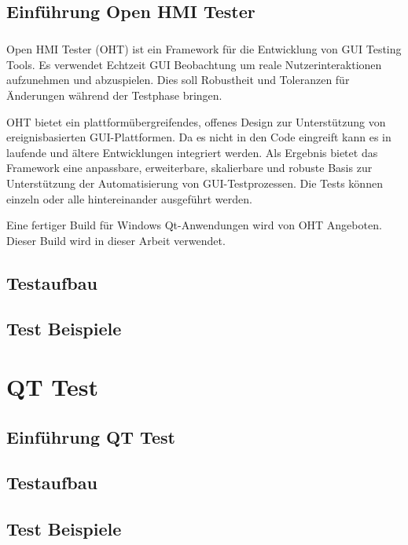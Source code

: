 		\section{Einführung Open HMI Tester}
		\paragraph{} Open HMI Tester (OHT) ist ein Framework für die Entwicklung von GUI Testing Tools. Es verwendet Echtzeit GUI Beobachtung um reale Nutzerinteraktionen aufzunehmen und abzuspielen. Dies soll Robustheit und Toleranzen für Änderungen während der Testphase bringen.
		
		OHT bietet ein plattformübergreifendes, offenes Design zur Unterstützung von ereignisbasierten GUI-Plattformen. Da es nicht in den Code eingreift kann es in laufende und ältere Entwicklungen integriert werden. Als Ergebnis bietet das Framework eine anpassbare, erweiterbare, skalierbare und robuste Basis zur Unterstützung der Automatisierung von GUI-Testprozessen. Die Tests können einzeln oder alle hintereinander ausgeführt werden.  
		
		Eine fertiger Build für Windows Qt-Anwendungen wird von OHT Angeboten. Dieser Build wird in dieser Arbeit verwendet.
		
		\section{Testaufbau}
		\section{Test Beispiele}
		
\chapter{QT Test}
		
		\section{Einführung QT Test}
		\section{Testaufbau}
		\section{Test Beispiele}
		
